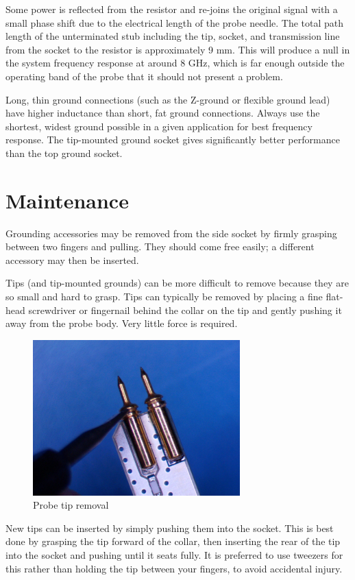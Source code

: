 \documentclass[11pt]{article}
\begin{document}
Some power is reflected from the resistor and re-joins the original signal with a small phase shift due to the
electrical length of the probe needle. The total path length of the unterminated stub including the tip, socket, and
transmission line from the socket to the resistor is approximately 9 mm. This will produce a null in the system
frequency response at around 8 GHz, which is far enough outside the operating band of the probe that it should not
present a problem.

Long, thin ground connections (such as the Z-ground or flexible ground lead) have higher inductance than short, fat
ground connections. Always use the shortest, widest ground possible in a given application for best frequency response.
The tip-mounted ground socket gives significantly better performance than the top ground socket.

\section{Maintenance}

Grounding accessories may be removed from the side socket by firmly grasping between two fingers and pulling. They
should come free easily; a different accessory may then be inserted.

Tips (and tip-mounted grounds) can be more difficult to remove because they are so small and hard to grasp. Tips
can typically be removed by placing a fine flat-head screwdriver or fingernail behind the collar on the tip and gently
pushing it away from the probe body. Very little force is required.

\begin{figure}[h!]
\centering
\includegraphics[width=8cm]{tip-removal.jpg}
\caption{Probe tip removal}
\end{figure}

New tips can be inserted by simply pushing them into the socket. This is best done by grasping the tip forward of the
collar, then inserting the rear of the tip into the socket and pushing until it seats fully. It is preferred to use
tweezers for this rather than holding the tip between your fingers, to avoid accidental injury.
\end{document}
